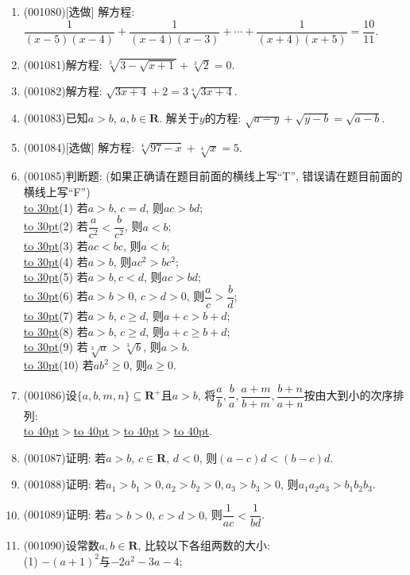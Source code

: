 \documentclass[10pt,a4paper]{article}
\newcommand{\blank}[1]{\underline{\hbox to #1pt{}}}
\begin{document}
\begin{enumerate}[1.]

\item {\tiny (001080)}[选做]
解方程: $\dfrac{1}{(x-5)(x-4)}+\dfrac{1}{(x-4)(x-3)}+\cdots+\dfrac{1}{(x+4)(x+5)}=\dfrac{10}{11}$.
\item {\tiny (001081)}解方程: $\sqrt[3]{3-\sqrt{x+1}}+\sqrt[3]{2}=0$.
\item {\tiny (001082)}解方程: $\sqrt{3x+4}+2=3\sqrt[4]{3x+4}$.
\item {\tiny (001083)}已知$a>b$, $a,b\in \mathbf{R}$. 解关于$y$的方程: $\sqrt{a-y}+\sqrt{y-b}=\sqrt{a-b}$.
\item {\tiny (001084)}[选做]
解方程: $\sqrt[4]{97-x}+\sqrt[4]{x}=5$.
\item {\tiny (001085)}判断题: (如果正确请在题目前面的横线上写``T'', 错误请在题目前面的横线上写``F'')\\ 
\blank{30}(1) 若$a>b$, $c=d$, 则$ac>bd$;\\ 
\blank{30}(2) 若$\dfrac{a}{c^2}<\dfrac{b}{c^2}$, 则$a<b$;\\ 
\blank{30}(3) 若$ac<bc$, 则$a<b$;\\ 
\blank{30}(4) 若$a>b$, 则$ac^2>bc^2$;\\ 
\blank{30}(5) 若$a>b,c<d$, 则$ac>bd$;\\ 
\blank{30}(6) 若$a>b>0$, $c>d>0$, 则$\dfrac{a}{c}>\dfrac{b}{d}$;\\ 
\blank{30}(7) 若$a>b$, $c\geq d$, 则$a+c>b+d$;\\ 
\blank{30}(8) 若$a>b$, $c\geq d$, 则$a+c\geq b+d$;\\ 
\blank{30}(9) 若$\sqrt[3]{a}>\sqrt[3]{b}$, 则$a>b$.\\ 
\blank{30}(10) 若$ab^2\geq 0$, 则$a\geq 0$.
\item {\tiny (001086)}设$\{a,b,m,n\}\subseteq\mathbf{R}^+$且$a>b$, 将$\dfrac{a}{b},\dfrac{b}{a},\dfrac{a+m}{b+m},\dfrac{b+n}{a+n}$按由大到小的次序排列:\\
\blank{40}$>$\blank{40}$>$\blank{40}$>$\blank{40}.
\item {\tiny (001087)}证明: 若$a>b$, $c\in\mathbf{R}$, $d<0$, 则$(a-c)d<(b-c)d$.
\item {\tiny (001088)}证明: 若$a_1>b_1>0,a_2>b_2>0,a_3>b_3>0$, 则$a_1a_2a_3>b_1b_2b_3$.
\item {\tiny (001089)}证明: 若$a>b>0$, $c>d>0$, 则$\dfrac{1}{ac}<\dfrac{1}{bd}$.
\item {\tiny (001090)}设常数$a,b\in\mathbf{R}$, 比较以下各组两数的大小:\\ 
(1) $-(a+1)^2$与$-2a^2-3a-4$;\\ 

\end{enumerate}
\end{document}
